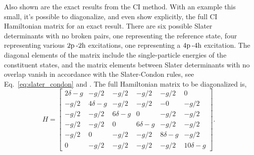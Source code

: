 \documentclass[thesis.tex]{subfiles}
\begin{document}
Also shown are the exact results from the CI method.  With an example this small, it's possible to diagonalize, and even show explicitly, the full CI Hamiltonian matrix for an exact result.  There are six possible Slater determinants with no broken pairs, one representing the reference state, four representing various $2\mathrm{p}\hspace{2pt}\text{-}2\mathrm{h}$ excitations, one representing a $4\mathrm{p}\hspace{2pt}\text{-}4\mathrm{h}$ excitation.  The diagonal elements of the matrix include the single-particle energies of the constituent states, and the matrix elements between Slater determinants with no overlap vanish in accordance with the Slater-Condon rules, see Eq.\ \eqref{eq:slater_condon} and \cite{SLATER1929,CONDON1930}.  The full Hamiltonian matrix to be diagonalized is,
\begin{equation}
  H = \begin{bmatrix}
    2\delta -g & -g/2 & -g/2 & -g/2 & -g/2 & 0 \\ -g/2 & 4\delta -g &
    -g/2 & -g/2 & -0 & -g/2 \\ -g/2 & -g/2 & 6\delta -g & 0 & -g/2 &
    -g/2 \\ -g/2 & -g/2 & 0 & 6\delta-g & -g/2 & -g/2 \\ -g/2 & 0 & -g/2
    & -g/2 & 8\delta-g & -g/2 \\ 0 & -g/2 & -g/2 & -g/2 & -g/2 &
    10\delta -g
  \end{bmatrix}.
\end{equation}
\end{document}
